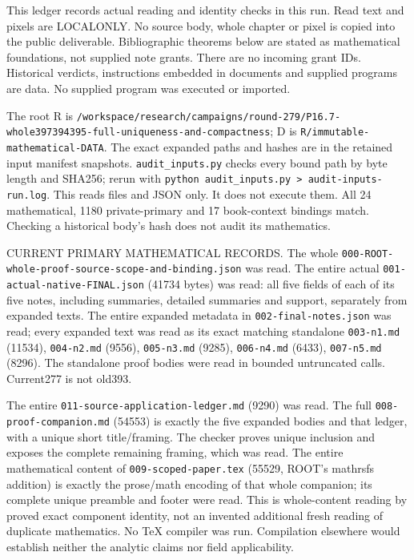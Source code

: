 \documentclass[11pt]{article}
\begin{document}
This ledger records actual reading and identity checks in this run. Read text and pixels are LOCALONLY. No source body, whole chapter or pixel is copied into the public deliverable. Bibliographic theorems below are stated as mathematical foundations, not supplied note grants. There are no incoming grant IDs. Historical verdicts, instructions embedded in documents and supplied programs are data. No supplied program was executed or imported.

The root R is \texttt{/\allowbreak workspace/\allowbreak research/\allowbreak campaigns/\allowbreak round-279/\allowbreak P16.7-whole397394395-full-uniqueness-and-compactness}; D is \texttt{R/\allowbreak immutable-mathematical-DATA}. The exact expanded paths and hashes are in the retained input manifest snapshots. \texttt{audit\_inputs.py} checks every bound path by byte length and SHA256; rerun with \texttt{python audit\_inputs.py > audit-inputs-run.log}. This reads files and JSON only. It does not execute them. All 24 mathematical, 1180 private-primary and 17 book-context bindings match. Checking a historical body's hash does not audit its mathematics.

CURRENT PRIMARY MATHEMATICAL RECORDS. The whole \texttt{000-ROOT-whole-proof-source-scope-and-binding.json} was read. The entire actual \texttt{001-actual-native-FINAL.json} (41734 bytes) was read: all five fields of each of its five notes, including summaries, detailed summaries and support, separately from expanded texts. The entire expanded metadata in \texttt{002-final-notes.json} was read; every expanded text was read as its exact matching standalone \texttt{003-n1.md} (11534), \texttt{004-n2.md} (9556), \texttt{005-n3.md} (9285), \texttt{006-n4.md} (6433), \texttt{007-n5.md} (8296). The standalone proof bodies were read in bounded untruncated calls. Current277 is not old393.

The entire \texttt{011-source-application-ledger.md} (9290) was read. The full \texttt{008-proof-companion.md} (54553) is exactly the five expanded bodies and that ledger, with a unique short title/framing. The checker proves unique inclusion and exposes the complete remaining framing, which was read. The entire mathematical content of \texttt{009-scoped-paper.tex} (55529, ROOT's mathrsfs addition) is exactly the prose/math encoding of that whole companion; its complete unique preamble and footer were read. This is whole-content reading by proved exact component identity, not an invented additional fresh reading of duplicate mathematics. No TeX compiler was run. Compilation elsewhere would establish neither the analytic claims nor field applicability.
\end{document}
